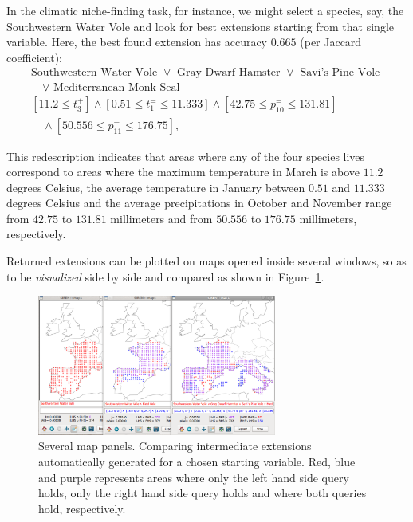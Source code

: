 In the climatic niche-finding task, for instance, we might select a
species, say, the Southwestern Water Vole and look for best extensions
starting from that single variable. Here, the best found extension has
accuracy $0.665$ (per Jaccard coefficient):
\begin{equation*}
\begin{array}{l}
\text{Southwestern Water Vole }\lor\text{ Gray Dwarf Hamster }\lor\text{ Savi's Pine Vole }\\[1mm]
\quad\lor\text{ Mediterranean Monk Seal}\\[3mm]
[11.2 \leq t_{3}^{+}] \land  [0.51 \leq t_{1}^{=} \leq 11.333]\land  [42.75 \leq p_{10}^{=} \leq 131.81] \\[1mm]
\quad\land [50.556 \leq p_{11}^{=} \leq 176.75],
\end{array}
\end{equation*}

This redescription indicates that areas where any of the four species
lives correspond to areas where the maximum temperature in March is
above $11.2$ degrees Celsius, the average temperature in January
between $0.51$ and $11.333$ degrees Celsius and the average
precipitations in October and November range from $42.75$ to $131.81$
millimeters and from $50.556$ to $176.75$ millimeters, respectively.

Returned extensions can be plotted on maps opened inside several
windows, so as to be \emph{visualized} side by side and compared as shown in
Figure~\ref{fig:comparison}.

\begin{figure}
  \centering
\includegraphics[width=0.7\textwidth]{screenshots/comparison}
  \caption{Several map panels. Comparing intermediate extensions automatically generated for a chosen starting variable. Red, blue and purple represents areas where only the left hand side query holds, only the right hand side query holds and where both queries hold, respectively.}
  \label{fig:comparison}
\end{figure}


